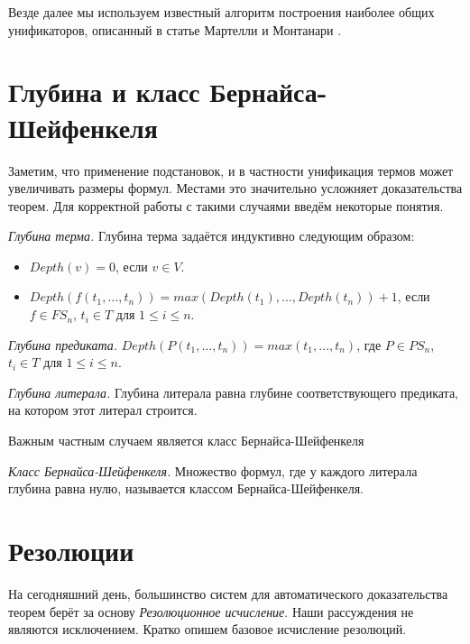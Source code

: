 Везде далее мы используем известный алгоритм построения наиболее общих унификаторов, описанный в статье Мартелли и Монтанари \cite{Martelli:1982:EUA:357162.357169}.

\section{Глубина и класс Бернайса-Шейфенкеля}
\label{sec:depth}
Заметим, что применение подстановок, и в частности унификация термов может увеличивать размеры формул. Местами это значительно усложняет доказательства теорем. Для корректной работы с такими случаями введём некоторые понятия.

\begin{definition}
\emph{Глубина терма.} Глубина терма задаётся индуктивно следующим образом: 
      \begin{itemize}
      	\item $Depth(v) = 0$, если $v \in V$. 
        \item $Depth(f(t_1, \ldots, t_n)) = max(Depth(t_1), \ldots, Depth(t_n)) + 1$, если $f \in FS_n$, $t_i \in T$ для $1 \leq i \leq n$.
      \end{itemize}
      
\emph{Глубина предиката.} $Depth(P(t_1, \ldots, t_n)) = max(t_1, \ldots, t_n)$, где $P \in PS_n$, $t_i \in T$ для $1 \leq i \leq n$.

\emph{Глубина литерала.} Глубина литерала равна глубине соответствующего предиката, на котором этот литерал строится.
\end{definition}

Важным частным случаем является класс Бернайса-Шейфенкеля

\begin{definition}
\emph{Класс Бернайса-Шейфенкеля.} Множество формул, где у каждого литерала глубина равна нулю, называется классом Бернайса-Шейфенкеля.
\end{definition}

\section{Резолюции}

На сегодняшний день, большинство систем для автоматического доказательства теорем берёт за основу \emph{Резолюционное исчисление}. Наши рассуждения не являются исключением. Кратко опишем базовое исчисление резолюций.

